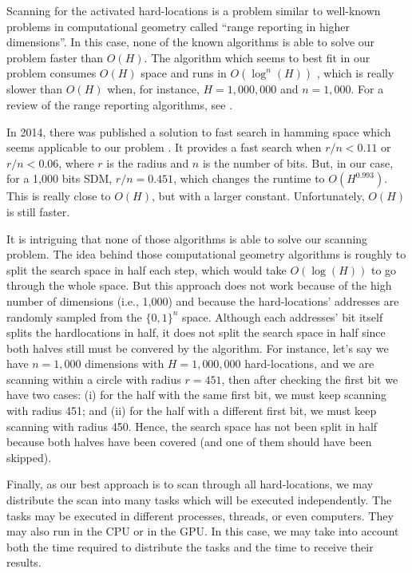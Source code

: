 Scanning for the activated hard-locations is a problem similar to well-known problems in computational geometry called ``range reporting in higher dimensions''. In this case, none of the known algorithms is able to solve our problem faster than $O(H)$. The algorithm which seems to best fit in our problem consumes $O(H)$ space and runs in $O(\log^n(H))$ \citep{chazelle1988functional}, which is really slower than $O(H)$ when, for instance, $H=1,000,000$ and $n=1,000$. For a review of the range reporting algorithms, see \citet{chan2011orthogonal}.

In 2014, there was published a solution to fast search in hamming space which seems applicable to our problem \citet{norouzi2014fast}. It provides a fast search when $r/n < 0.11$ or $r/n < 0.06$, where $r$ is the radius and $n$ is the number of bits. But, in our case, for a 1,000 bits SDM, $r/n = 0.451$, which changes the runtime to $O(H^{0.993})$. This is really close to $O(H)$, but with a larger constant. Unfortunately, $O(H)$ is still faster.

It is intriguing that none of those algorithms is able to solve our scanning problem. The idea behind those computational geometry algorithms is roughly to split the search space in half each step, which would take $O(\log(H))$ to go through the whole space. But this approach does not work because of the high number of dimensions (i.e., 1,000) and because the hard-locations' addresses are randomly sampled from the $\{0, 1\}^n$ space. Although each addresses' bit itself splits the hardlocations in half, it does not split the search space in half since both halves still must be convered by the algorithm. For instance, let's say we have $n=1,000$ dimensions with $H=1,000,000$ hard-locations, and we are scanning within a circle with radius $r=451$, then after checking the first bit we have two cases: (i) for the half with the same first bit, we must keep scanning with radius 451; and (ii) for the half with a different first bit, we must keep scanning with radius 450. Hence, the search space has not been split in half because both halves have been covered (and one of them should have been skipped).

Finally, as our best approach is to scan through all hard-locations, we may distribute the scan into many tasks which will be executed independently. The tasks may be executed in different processes, threads, or even computers. They may also run in the CPU or in the GPU. In this case, we may take into account both the time required to distribute the tasks and the time to receive their results.

